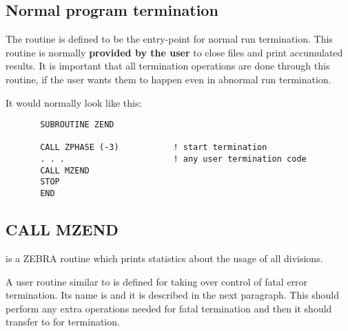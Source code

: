 \subsection{\protect\label{ZEND}Normal program termination}
\par The routine
 is defined to be the entry-point for normal run
termination. This routine is normally {\bf provided by the user}
to close files and print accumulated results.
It is important that all termination operations are
done through this routine,
if the user wants them to happen even in abnormal run termination.
\par It would normally look like this:
\begin{verbatim}
       SUBROUTINE ZEND
 
       CALL ZPHASE (-3)           ! start termination
       . . .                      ! any user termination code
       CALL MZEND
       STOP
       END
\end{verbatim}
\subsection{CALL MZEND}
\par {} is a ZEBRA routine which prints statistics about
the usage of all divisions.
\par A user routine similar to  is defined for taking over control
of fatal error termination. Its name is  and it is
described in the next paragraph.
This should perform any extra operations needed
for fatal termination and then it should transfer
to  for termination.
